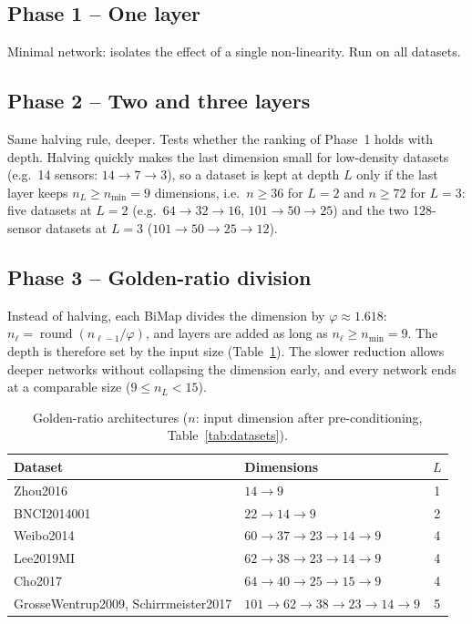 \documentclass[11pt,a4paper]{article}
\begin{document}
\subsection{Phase 1 -- One layer}
Minimal network: isolates the effect of a single non-linearity. Run on all datasets.

\subsection{Phase 2 -- Two and three layers}
Same halving rule, deeper. Tests whether the ranking of Phase~1 holds with depth.
Halving quickly makes the last dimension small for low-density datasets
(e.g.\ 14 sensors: $14 \to 7 \to 3$), so a dataset is kept at depth $L$ only if the
last layer keeps $n_L \geq n_{\min} = 9$ dimensions, i.e.\ $n \geq 36$ for $L=2$ and
$n \geq 72$ for $L=3$: five datasets at $L = 2$ (e.g.\ $64 \to 32 \to 16$,
$101 \to 50 \to 25$) and the two 128-sensor datasets at $L = 3$ ($101 \to 50 \to 25 \to 12$).

\subsection{Phase 3 -- Golden-ratio division}
Instead of halving, each BiMap divides the dimension by $\varphi \approx 1.618$:
$n_\ell = \operatorname{round}(n_{\ell-1}/\varphi)$, and layers are added as long as
$n_\ell \geq n_{\min} = 9$. The depth is therefore set by the input size
(Table~\ref{tab:golden}). The slower reduction allows deeper networks without collapsing
the dimension early, and every network ends at a comparable size ($9 \leq n_L < 15$).

\begin{table}[h]
\centering
\caption{Golden-ratio architectures ($n$: input dimension after pre-conditioning, Table~\ref{tab:datasets}).}
\label{tab:golden}
\small
\begin{tabular}{llc}
\toprule
Dataset & Dimensions & $L$ \\
\midrule
Zhou2016          & $14 \to 9$ & 1 \\
BNCI2014001       & $22 \to 14 \to 9$ & 2 \\
Weibo2014         & $60 \to 37 \to 23 \to 14 \to 9$ & 4 \\
Lee2019MI         & $62 \to 38 \to 23 \to 14 \to 9$ & 4 \\
Cho2017           & $64 \to 40 \to 25 \to 15 \to 9$ & 4 \\
GrosseWentrup2009, Schirrmeister2017 & $101 \to 62 \to 38 \to 23 \to 14 \to 9$ & 5 \\
\bottomrule
\end{tabular}
\end{table}
\end{document}
